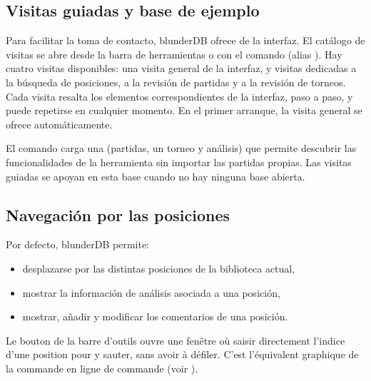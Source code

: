 \documentclass[letterpaper,10pt,spanish]{sphinxmanual}
\begin{document}
\subsection{Visitas guiadas y base de ejemplo}
\label{\detokenize{manuel:visites-guidees-et-base-d-exemple}}\label{\detokenize{manuel:visites-guidees}}
\sphinxAtStartPar
Para facilitar la toma de contacto, blunderDB ofrece  de la interfaz. El catálogo de visitas se abre desde la barra de herramientas o con el comando  (alias ). Hay cuatro visitas disponibles: una visita general de la interfaz, y visitas dedicadas a la búsqueda de posiciones, a la revisión de partidas y a la revisión de torneos. Cada visita resalta los elementos correspondientes de la interfaz, paso a paso, y puede repetirse en cualquier momento. En el primer arranque, la visita general se ofrece automáticamente.

\sphinxAtStartPar
El comando  carga una  (partidas, un torneo y análisis) que permite descubrir las funcionalidades de la herramienta sin importar las partidas propias. Las visitas guiadas se apoyan en esta base cuando no hay ninguna base abierta.


\subsection{Navegación por las posiciones}
\label{\detokenize{manuel:navigation-dans-les-positions}}\label{\detokenize{manuel:navigation-positions}}
\sphinxAtStartPar
Por defecto, blunderDB permite:
\begin{itemize}
\item {} 
\sphinxAtStartPar
desplazarse por las distintas posiciones de la biblioteca actual,

\item {} 
\sphinxAtStartPar
mostrar la información de análisis asociada a una posición,

\item {} 
\sphinxAtStartPar
mostrar, añadir y modificar los comentarios de una posición.

\end{itemize}

\sphinxAtStartPar
Le bouton  de la barre d’outils ouvre une fenêtre où
saisir directement l’indice d’une position pour y sauter, sans avoir à
défiler. C’est l’équivalent graphique de la commande \sphinxcode{\sphinxupquote{{[}number{]}}} en ligne de
commande (voir {\hyperref[\detokenize{cmd_mode:cmd-positions}]{}}).
\end{document}
